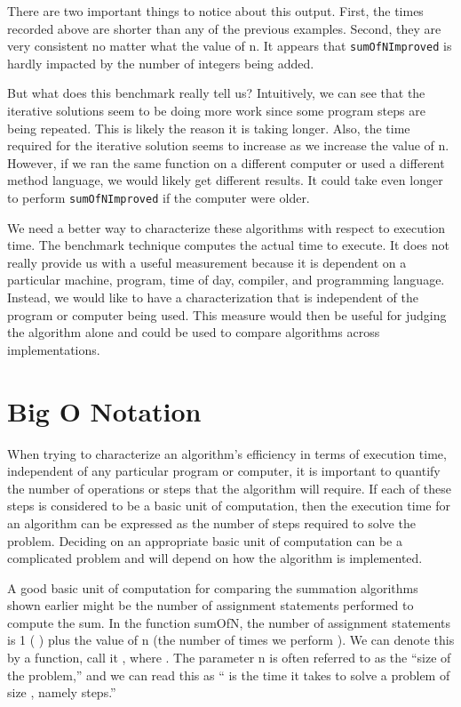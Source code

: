 There are two important things to notice about this output. First, the times recorded above are shorter than any of the previous examples. Second, they are very consistent no matter what the value of n. It appears that \texttt{sumOfNImproved} is hardly impacted by the number of integers being added.


But what does this benchmark really tell us? Intuitively, we can see that the iterative solutions seem to be doing more work since some program steps are being repeated. This is likely the reason it is taking longer. Also, the time required for the iterative solution seems to increase as we increase the value of n. However, if we ran the same function on a different computer or used a different method language, we would likely get different results. It could take even longer to perform \texttt{sumOfNImproved} if the computer were older.

We need a better way to characterize these algorithms with respect to execution time. The benchmark technique computes the actual time to execute. It does not really provide us with a useful measurement because it is dependent on a particular machine, program, time of day, compiler, and programming language. Instead, we would like to have a characterization that is independent of the program or computer being used. This measure would then be useful for judging the algorithm alone and could be used to compare algorithms across implementations.



\section{Big O Notation}
When trying to characterize an algorithm’s efficiency in terms of execution time, independent of any particular program or computer, it is important to quantify the number of operations or steps that the algorithm will require. If each of these steps is considered to be a basic unit of computation, then the execution time for an algorithm can be expressed as the number of steps required to solve the problem. Deciding on an appropriate basic unit of computation can be a complicated problem and will depend on how the algorithm is implemented.

A good basic unit of computation for comparing the summation algorithms shown earlier might be the number of assignment statements performed to compute the sum. In the function sumOfN, the number of assignment statements is 1 (
) plus the value of n (the number of times we perform ). We can denote this by a function, call it , where . The parameter n is often referred to as the ``size of the problem,'' and we can read this as “ is the time it takes to solve a problem of size , namely
steps.”

